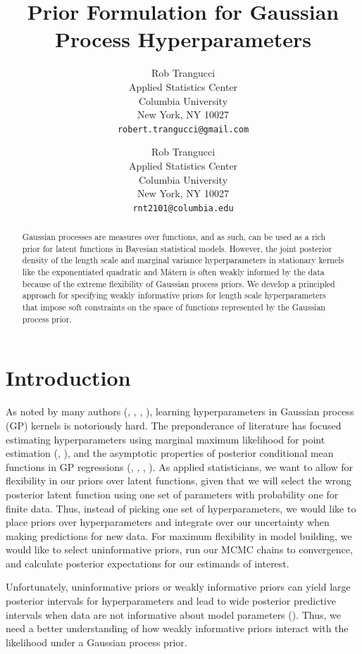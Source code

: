 \documentclass{article}
\title{Prior Formulation for Gaussian Process Hyperparameters}
\author{
  Rob Trangucci \\
  Applied Statistics Center\\
  Columbia University\\
  New York, NY 10027 \\
  \texttt{robert.trangucci@gmail.com} \\
}
\author{
  Rob Trangucci \\
  Applied Statistics Center\\
  Columbia University\\
  New York, NY 10027 \\
  \texttt{rnt2101@columbia.edu} \\
}
\begin{document}

\maketitle

\begin{abstract}
  Gaussian processes are measures over functions, and as such, can be used as a
  rich prior for latent functions in Bayesian statistical models. However, the
  joint posterior density of the length scale and marginal variance
  hyperparameters in stationary kernels like the exponentiated quadratic and
	M\'{a}tern is often weakly informed by the data because of the extreme
  flexibility of Gaussian process priors. We develop a principled approach for
  specifying weakly informative priors for length scale hyperparameters that impose
  soft constraints on the space of functions represented by the Gaussian
  process prior.
\end{abstract}


\section{Introduction}

As noted by many authors (\citet{flaxman2015fast},
\citet{stein2012interpolation}, \citet{rasmussen2006gaussian},
\citet{fuglstad2015interpretable}), learning hyperparameters in Gaussian process
(GP) kernels is notoriously hard. The preponderance of literature has focused
estimating hyperparameters using marginal maximum likelihood for point
estimation (\citet{stein2012interpolation}, \citet{rasmussen2006gaussian}), and
the asymptotic properties of posterior conditional mean functions in GP
regressions (\citet{seeger2008information}, \citet{stein2012interpolation},
\citet{rasmussen2006gaussian}, \citet{williams2000upper}). As applied
statisticians, we want to allow for flexibility in our priors over latent
functions, given that we will select the wrong posterior latent function using
one set of parameters with probability one for finite data. Thus, instead of
picking one set of hyperparameters, we would like to place priors over
hyperparameters and integrate over our uncertainty when making predictions for
new data. For maximum flexibility in model building, we would like to select
uninformative priors, run our MCMC chains to convergence, and calculate
posterior expectations for our estimands of interest. 

Unfortunately, uninformative priors or weakly informative priors
can yield large posterior intervals for hyperparameters and lead to wide
posterior predictive intervals when data are not informative about model
parameters (\citet{fuglstad2015interpretable}). Thus, we need a better
understanding of how weakly informative priors interact with the likelihood
under a Gaussian process prior.
\end{document}
